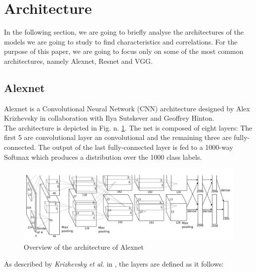 \section{Architecture}
In the following section, we are going to briefly analyse the architectures of the models we are going to study to find characteristics and correlations. For the purpose of this paper, we are going to focus only on some of the most common architectures, namely Alexnet, Resnet and VGG. 
\subsection{Alexnet}
Alexnet is a Convolutional Neural Network (CNN) architecture designed by  Alex Krizhevsky in collaboration with Ilya Sutskever and Geoffrey Hinton. \cite{NIPS2012_c399862d}\\
The architecture is depicted in Fig. n. \ref{fig:alexnet_architecture}. The net is composed of eight layers:
The first 5 are convolutional layer an convolutional and the remaining three are fully- connected. The output of the last fully-connected layer is fed to a 1000-way Softmax which produces a distribution over the 1000 class labels. \cite{NIPS2012_c399862d}\\
\begin{figure}[htb]
    \centering
    \includegraphics[scale = 0.4]{img/alexnet_architecture.png}
    \caption[Overview of the architecture of Alexnet]{Overview of the architecture of Alexnet \cite{NIPS2012_c399862d}}
    \label{fig:alexnet_architecture}
\end{figure}


As described by \textit{Krizhevsky et al.} in \cite{NIPS2012_c399862d}, the layers are defined as it follows:

